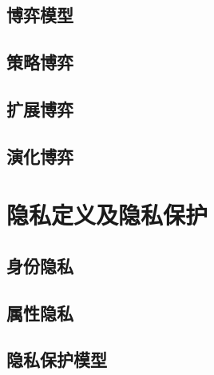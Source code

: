 \subsection{博弈模型}
\subsection{策略博弈}
\subsection{扩展博弈}
\subsection{演化博弈}


\section{隐私定义及隐私保护}
\subsection{身份隐私}
\subsection{属性隐私}
\subsection{隐私保护模型}

